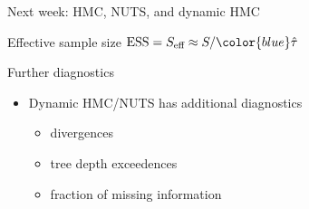 \documentclass[finnish,english,t]{beamer}
\def\eff{\text{eff}}
\def\ESS{\text{ESS}}
\begin{document}
\begin{frame}
  
   {\Large\color{navyblue} Next week: HMC, NUTS, and dynamic HMC}

   Effective sample size $\ESS = S_\eff \approx S/{\color{blue}\hat{\tau}}$\\
   
\end{frame}

\begin{frame}
   
   {\Large\color{navyblue} Further diagnostics}

   \begin{itemize}
   \item Dynamic HMC/NUTS has additional diagnostics
     \begin{itemize}
     \item divergences
     \item tree depth exceedences
     \item fraction of missing information
     \end{itemize}
   \end{itemize}
   
 \end{frame}
\end{document}
